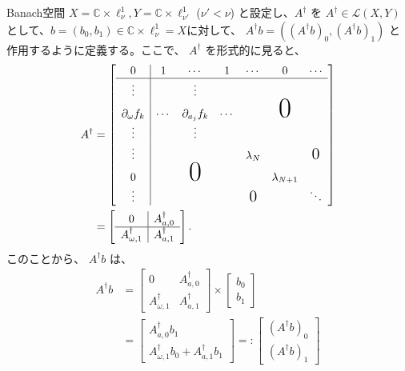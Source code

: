 Banach空間 $X= \mathbb{C} \times \ell^1_\nu, Y=\mathbb{C} \times \ell^1_{\nu'}$ ($\nu'<\nu$) と設定し、$A^\dagger$ を $A^\dagger \in \mathcal{L}(X,Y)$ として、$b=(b_0,b_1)\in \mathbb{C}\times \ell^1_\nu = X$に対して、 $A^\dagger b = ((A^\dagger b)_0 , (A^\dagger b)_1 )$ と作用するように定義する。ここで、 $A^\dagger$ を形式的に見ると、
\footnotesize
\begin{align*}
    A^\dagger &= 
    \left[\begin{array}{c|cccccc}
    0 & 1 &  \cdots  & 1 & \cdots & {0} & \cdots  \\\hline
    \vdots & &  \vdots & & & & \\
    \partial_\omega f_k & \cdots & \partial_{a_j} f_k & \cdots & & \Hugezero &\\
    \vdots& &  \vdots & & & & \\
    \vdots & & & & \lambda_N & & \Largezero   \\
    0 & & \Hugezero & & & \lambda_{N+1} & \\
    \vdots & & & & \Largezero& & \ddots
    \end{array}\right] \\
    &=
    \left[
    \begin{array}{c|c}
    0 & A_{a,0}^\dagger \\
    \hline 
    A_{\omega, 1}^\dagger & A_{a,1}^\dagger
    \end{array}
    \right].
\end{align*}
\normalsize
このことから、 $A^\dagger b$ は、
    \begin{align*}
    A^\dagger b &= 
    \begin{bmatrix}
    0 & A_{a,0}^\dagger \\
    A_{\omega ,1}^\dagger & A_{a,1}^\dagger
    \end{bmatrix}
    \times
    \begin{bmatrix}
    b_0 \\
    b_1
    \end{bmatrix} \\
    &=
    \begin{bmatrix}
    A^\dagger_{a,0} b_1 \\
    A^\dagger_{\omega ,1} b_0 + A^\dagger_{a,1} b_1
    \end{bmatrix}
    =: 
    \begin{bmatrix}
    (A^\dagger b)_0 \\
    (A^\dagger b)_1
    \end{bmatrix}
    \end{align*}
